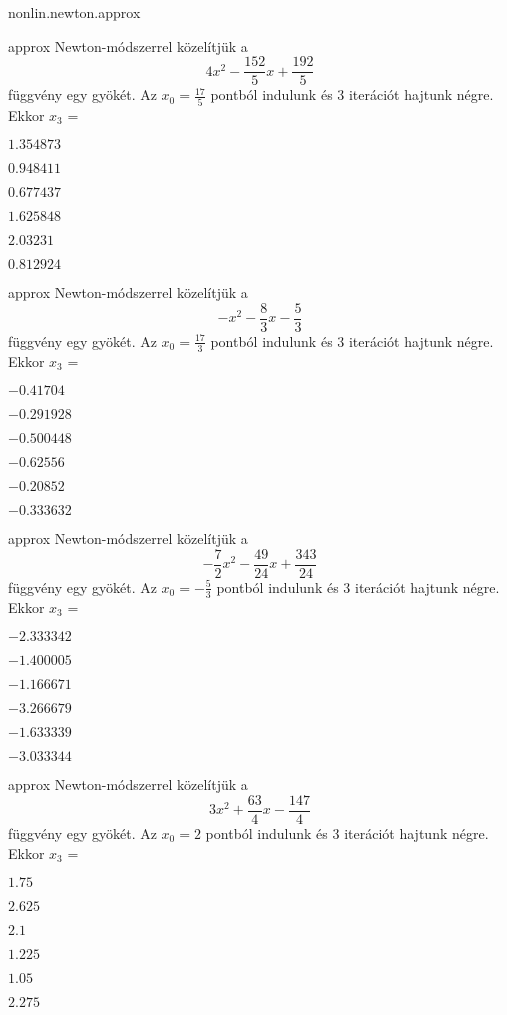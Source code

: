 \documentclass[12pt]{article}
\begin{document}
\begin{quiz}{nonlin.newton.approx}\begin{multi}{approx}
Newton-módszerrel közelítjük a
$$4x^2-\frac{152}{5}x+\frac{192}{5}$$
függvény egy gyökét. Az $x_{0}=\frac{17}{5}$ pontból indulunk és $3$ iterációt hajtunk 
négre. Ekkor $x_{3}$ =
\item* $1.354873$
\item  $0.948411$
\item  $0.677437$
\item  $1.625848$
\item  $2.03231$
\item  $0.812924$
\end{multi}


\begin{multi}{approx}
Newton-módszerrel közelítjük a
$$-x^2-\frac{8}{3}x-\frac{5}{3}$$
függvény egy gyökét. Az $x_{0}=\frac{17}{3}$ pontból indulunk és $3$ iterációt hajtunk 
négre. Ekkor $x_{3}$ =
\item* $-0.41704$
\item  $-0.291928$
\item  $-0.500448$
\item  $-0.62556$
\item  $-0.20852$
\item  $-0.333632$
\end{multi}


\begin{multi}{approx}
Newton-módszerrel közelítjük a
$$-\frac{7}{2}x^2-\frac{49}{24}x+\frac{343}{24}$$
függvény egy gyökét. Az $x_{0}=-\frac{5}{3}$ pontból indulunk és $3$ iterációt hajtunk 
négre. Ekkor $x_{3}$ =
\item* $-2.333342$
\item  $-1.400005$
\item  $-1.166671$
\item  $-3.266679$
\item  $-1.633339$
\item  $-3.033344$
\end{multi}


\begin{multi}{approx}
Newton-módszerrel közelítjük a
$$3x^2+\frac{63}{4}x-\frac{147}{4}$$
függvény egy gyökét. Az $x_{0}=2$ pontból indulunk és $3$ iterációt hajtunk 
négre. Ekkor $x_{3}$ =
\item* $1.75$
\item  $2.625$
\item  $2.1$
\item  $1.225$
\item  $1.05$
\item  $2.275$
\end{multi}



\end{quiz}
\end{document}
